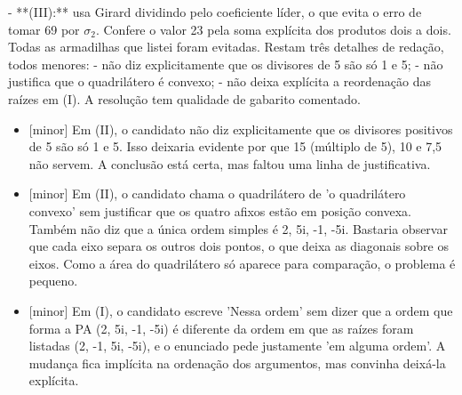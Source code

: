 \documentclass{article}%
\begin{document}
{-} **(III):** usa Girard dividindo pelo coeficiente líder, o que evita o erro de tomar 69 por $\sigma$$_{2}$. Confere o valor 23 pela soma explícita dos produtos dois a dois.\newline%
\newline%
Todas as armadilhas que listei foram evitadas. Restam três detalhes de redação, todos menores:\newline%
{-} não diz explicitamente que os divisores de 5 são só 1 e 5;\newline%
{-} não justifica que o quadrilátero é convexo;\newline%
{-} não deixa explícita a reordenação das raízes em (I).\newline%
\newline%
A resolução tem qualidade de gabarito comentado.%
\begin{itemize}%
\item%
{[}minor{]} Em (II), o candidato não diz explicitamente que os divisores positivos de 5 são só 1 e 5. Isso deixaria evidente por que 15 (múltiplo de 5), 10 e 7,5 não servem. A conclusão está certa, mas faltou uma linha de justificativa.%
\item%
{[}minor{]} Em (II), o candidato chama o quadrilátero de 'o quadrilátero convexo' sem justificar que os quatro afixos estão em posição convexa. Também não diz que a única ordem simples é 2, 5i, -1, -5i. Bastaria observar que cada eixo separa os outros dois pontos, o que deixa as diagonais sobre os eixos. Como a área do quadrilátero só aparece para comparação, o problema é pequeno.%
\item%
{[}minor{]} Em (I), o candidato escreve 'Nessa ordem' sem dizer que a ordem que forma a PA (2, 5i, -1, -5i) é diferente da ordem em que as raízes foram listadas (2, -1, 5i, -5i), e o enunciado pede justamente 'em alguma ordem'. A mudança fica implícita na ordenação dos argumentos, mas convinha deixá{-}la explícita.%
\end{itemize}%
\end{document}
